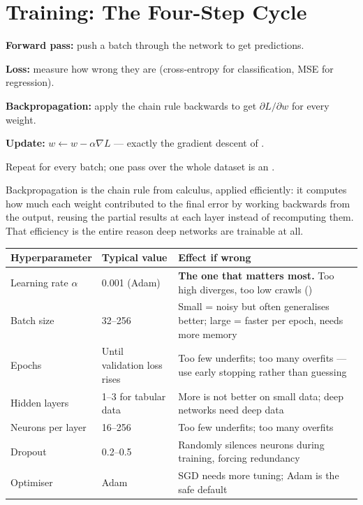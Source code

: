 \section{Training: The Four-Step Cycle}

\begin{definitionbox}
\begin{tightnum}
  \item \textbf{Forward pass:} push a batch through the network to get predictions.
  \item \textbf{Loss:} measure how wrong they are (cross-entropy for classification,
        MSE for regression).
  \item \textbf{Backpropagation:} apply the chain rule backwards to get
        $\partial L / \partial w$ for every weight.
  \item \textbf{Update:} $w \leftarrow w - \alpha \nabla L$ --- exactly the
        gradient descent of .
\end{tightnum}
Repeat for every batch; one pass over the whole dataset is an .
\end{definitionbox}

\begin{conceptbox}
Backpropagation is the chain rule from calculus, applied efficiently: it computes
how much each weight contributed to the final error by working backwards from the
output, reusing the partial results at each layer instead of recomputing them.
That efficiency is the entire reason deep networks are trainable at all.
\end{conceptbox}

\begin{longtable}{@{}L{3.4cm}L{4.4cm}L{6.4cm}@{}}
\toprule
{}
\textbf{Hyperparameter} & \textbf{Typical value} & \textbf{Effect if wrong} \\
\midrule
\endhead
Learning rate $\alpha$ & 0.001 (Adam) & \textbf{The one that matters most.} Too high diverges, too low crawls () \\
Batch size & 32--256 & Small = noisy but often generalises better; large = faster per epoch, needs more memory \\
Epochs & Until validation loss rises & Too few underfits; too many overfits --- use early stopping rather than guessing \\
Hidden layers & 1--3 for tabular data & More is not better on small data; deep networks need deep data \\
Neurons per layer & 16--256 & Too few underfits; too many overfits \\
Dropout & 0.2--0.5 & Randomly silences neurons during training, forcing redundancy \\
Optimiser & Adam & SGD needs more tuning; Adam is the safe default \\
\bottomrule
\end{longtable}

